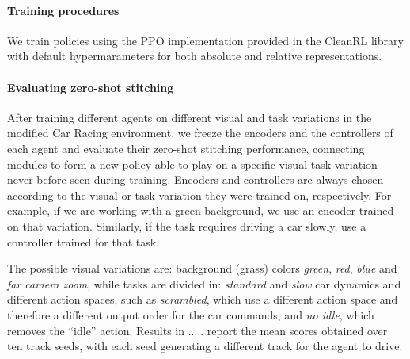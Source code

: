 \paragraph{Training procedures}
We train policies using the PPO implementation provided in the CleanRL library \citep{huang2022cleanrl} with default hypermarameters for both absolute and relative representations.


\paragraph{Evaluating zero-shot stitching}
After training different agents on different visual and task variations in the modified Car Racing environment, we freeze the encoders and the controllers of each agent and evaluate their zero-shot stitching performance, connecting modules to form a new policy able to play on a specific visual-task variation never-before-seen during training. Encoders and controllers are always chosen according to the visual or task variation they were trained on, respectively. For example, if we are working with a green background, we use an encoder trained on that variation. Similarly, if the task requires driving a car slowly, use a controller trained for that task.

The possible visual variations are: background (grass) colors \textit{green}, \textit{red}, \textit{blue} and \textit{far camera zoom}, while tasks are divided in: \textit{standard} and \textit{slow} car dynamics and different action spaces, such as \textit{scrambled}, which use a different action space and therefore a different output order for the car commands, and \textit{no idle}, which removes the ``idle'' action.
Results in  ..... report the mean scores obtained over ten track seeds, with each seed generating a different track for the agent to drive. 
\fi
